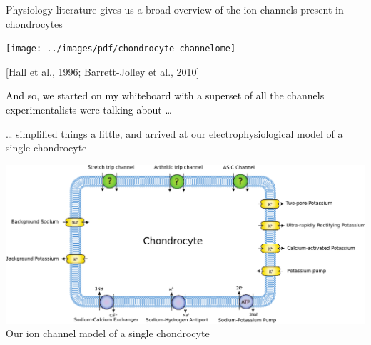 \documentclass{beamer}
\newcommand{\references}[1] {
  \begin{flushright}
    \scriptsize [#1] \normalsize
  \end{flushright}
}
\begin{document}
%
%
%

\begin{frame}{Physiology literature gives us a broad overview of the
    ion channels present in chondrocytes}

  \vspace{0.4cm}
  \texttt{[image: ../images/pdf/chondrocyte-channelome]}

  \references{Hall et al., 1996; Barrett-Jolley et al., 2010}

\end{frame}


{

\begin{frame}{\textcolor{black}{And so, we started on my whiteboard
      with a superset of all the channels experimentalists were
      talking about \ldots}}

\end{frame}
}

%
%

\begin{frame}{\ldots{} simplified things a little, and arrived at our
    electrophysiological model of a single chondrocyte}

  \begin{center}
    \includegraphics[width=\textwidth]{../images/pdf/chondrocyte-model-cellml}
    {\\[-0.1cm] \scriptsize Our ion channel model of a single chondrocyte}
  \end{center}

\end{frame}
\end{document}
